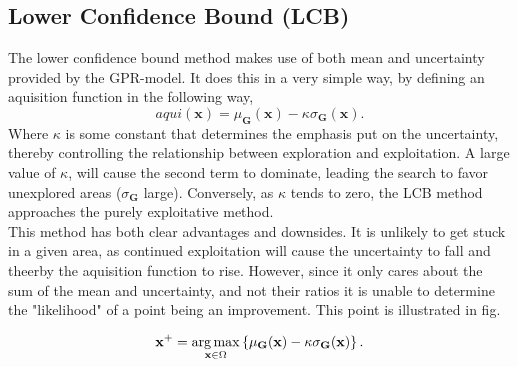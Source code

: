 \documentclass[working, oneside]{../../../Preambles/marginclass}
\begin{document}
\subsection{Lower Confidence Bound (LCB)}
The lower confidence bound method makes use of both mean and uncertainty provided by the GPR-model. It does this in a very simple way, by defining an aquisition function in the following way,
\[
aqui\left( \bm{x} \right) = \mu _{\bm{G}}\left( \bm{x} \right)  - \kappa \sigma_{\bm{G}}\left( \bm{x} \right) 
.\] 
Where $\kappa$ is some constant that determines the emphasis put on the uncertainty, thereby controlling the relationship between exploration and exploitation. A large value of $\kappa$, will cause the second term to dominate, leading the search to favor unexplored areas ($\sigma_{\bm{G}}$ large). Conversely, as $\kappa$ tends to zero, the LCB method approaches the purely exploitative method. \\
This method has both clear advantages and downsides. It is unlikely to get stuck in a given area, as continued exploitation will cause the uncertainty to fall and theerby the aquisition function to rise. However, since it only cares about the sum of the mean and uncertainty, and not their ratios it is unable to determine the "likelihood" of a point being an improvement. This point is illustrated in {fig}.

\[
\mathbf{x}^{+} = \operatorname*{arg\,max}_{\mathbf{x} \in \Omega} \left\{ \mu_{\mathbf{G}}(\mathbf{x}) - \kappa \sigma_{\mathbf{G}}(\mathbf{x}) \right\}
.\] 
\end{document}
